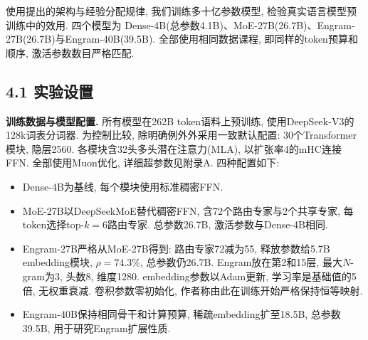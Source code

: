 使用提出的架构与经验分配规律, 我们训练多十亿参数模型, 检验真实语言模型预训练中的效用. 四个模型为 Dense-4B(总参数4.1B)、MoE-27B(26.7B)、Engram-27B(26.7B)与Engram-40B(39.5B). 全部使用相同数据课程, 即同样的token预算和顺序, 激活参数数目严格匹配.

\subsection*{4.1 实验设置}
\noindent\textbf{训练数据与模型配置.}
所有模型在262B token语料上预训练, 使用DeepSeek-V3\cite{engram-liu2024deepseek}的128k词表分词器. 为控制比较, 除明确例外外采用一致默认配置: 30个Transformer模块, 隐层2560. 各模块含32头多头潜在注意力(MLA)\cite{engram-deepseekai2024deepseekv2strongeconomicalefficient}, 以扩张率4的mHC\cite{engram-xie2025mhcmanifoldconstrainedhyperconnections}连接FFN. 全部使用Muon\cite{engram-jordan2024muon,engram-liu2025muon}优化, 详细超参数见附录A. 四种配置如下:
\begin{itemize}
\item Dense-4B为基线, 每个模块使用标准稠密FFN.
\item MoE-27B以DeepSeekMoE\cite{engram-dai2024deepseekmoe}替代稠密FFN, 含72个路由专家与2个共享专家, 每token选择top-$k=6$路由专家. 总参数26.7B, 激活参数与Dense-4B相同.
\item Engram-27B严格从MoE-27B得到: 路由专家72减为55, 释放参数给5.7B embedding模块, $\rho=74.3\%$, 总参数仍26.7B. Engram放在第2和15层, 最大$N$-gram为3, 头数8, 维度1280. embedding参数以Adam\cite{engram-kingma2014adam}更新, 学习率是基础值的5倍, 无权重衰减. 卷积参数零初始化, 作者称由此在训练开始严格保持恒等映射.
\item Engram-40B保持相同骨干和计算预算, 稀疏embedding扩至18.5B, 总参数39.5B, 用于研究Engram扩展性质.
\end{itemize}

